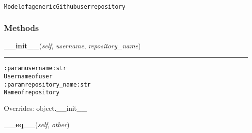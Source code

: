 \begin{alltt}
Model of a generic Github user repository 
\end{alltt}



  \subsubsection{Methods}

    \vspace{0.5ex}

\hspace{.8\funcindent}\begin{boxedminipage}{\funcwidth}

    \raggedright \textbf{\_\_init\_\_}(\textit{self}, \textit{username}, \textit{repository\_name})

    \vspace{-1.5ex}

    \rule{\textwidth}{0.5\fboxrule}
\setlength{\parskip}{2ex}
\begin{alltt}

:param username: str
    Username of user
:param repository\_name: str
    Name of repository
\end{alltt}

\setlength{\parskip}{1ex}
      Overrides: object.\_\_init\_\_

    \end{boxedminipage}

    \label{hal:internet:github:GithubUserRepository:__eq__}

    \vspace{0.5ex}

\hspace{.8\funcindent}\begin{boxedminipage}{\funcwidth}

    \raggedright \textbf{\_\_eq\_\_}(\textit{self}, \textit{other})

\setlength{\parskip}{2ex}
\setlength{\parskip}{1ex}
    \end{boxedminipage}


